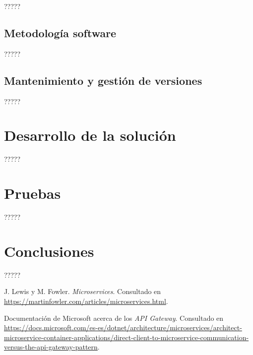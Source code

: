 \documentclass[11pt,spanish,listoffigures]{tfgetsinf}
\begin{document}
?????

\section{Metodología software}

?????

\section{Mantenimiento y gestión de versiones}

?????


\chapter{Desarrollo de la solución}

?????


\chapter{Pruebas}

?????


\chapter{Conclusiones}

?????


\begin{thebibliography}{10}

	J. Lewis y M. Fowler.
	\newblock \textit{Microservices}.
	\newblock Consultado en 
	\url{https://martinfowler.com/articles/microservices.html}.

	Documentación de Microsoft acerca de los \emph{API Gateway}.
	\newblock Consultado en 
	\url{https://docs.microsoft.com/es-es/dotnet/architecture/microservices/architect-microservice-container-applications/direct-client-to-microservice-communication-versus-the-api-gateway-pattern}.

\end{thebibliography}
\end{document}
